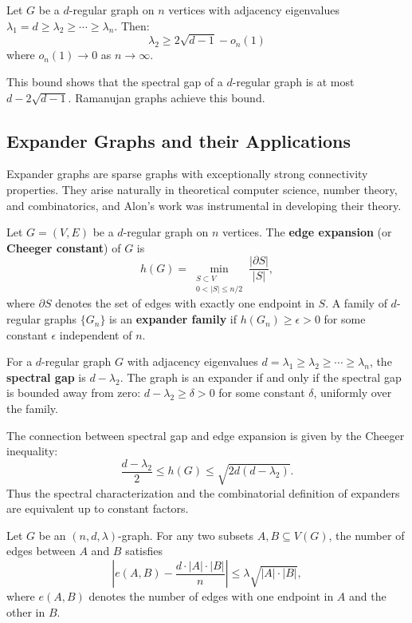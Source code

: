 \begin{theorem}
Let $G$ be a $d$-regular graph on $n$ vertices with adjacency eigenvalues $\lambda_1 = d \geq \lambda_2 \geq \cdots \geq \lambda_n$. Then:
\[
\lambda_2 \geq 2\sqrt{d-1} - o_n(1)
\]
where $o_n(1) \to 0$ as $n \to \infty$.
\end{theorem}

This bound shows that the spectral gap of a $d$-regular graph is at most $d - 2\sqrt{d-1}$. Ramanujan graphs achieve this bound.

\subsection{Expander Graphs and their Applications}

Expander graphs are sparse graphs with exceptionally strong connectivity properties. They arise naturally in theoretical computer science, number theory, and combinatorics, and Alon's work was instrumental in developing their theory.

\begin{definition}
Let $G = (V, E)$ be a $d$-regular graph on $n$ vertices. The \textbf{edge expansion} (or \textbf{Cheeger constant}) of $G$ is
\[
h(G) = \min_{\substack{S \subset V \\ 0 < |S| \leq n/2}} \frac{|\partial S|}{|S|},
\]
where $\partial S$ denotes the set of edges with exactly one endpoint in $S$. A family of $d$-regular graphs $\{G_n\}$ is an \textbf{expander family} if $h(G_n) \geq \epsilon > 0$ for some constant $\epsilon$ independent of $n$.
\end{definition}

\begin{definition}
For a $d$-regular graph $G$ with adjacency eigenvalues $d = \lambda_1 \geq \lambda_2 \geq \cdots \geq \lambda_n$, the \textbf{spectral gap} is $d - \lambda_2$. The graph is an expander if and only if the spectral gap is bounded away from zero: $d - \lambda_2 \geq \delta > 0$ for some constant $\delta$, uniformly over the family.
\end{definition}

The connection between spectral gap and edge expansion is given by the Cheeger inequality:
\[
\frac{d - \lambda_2}{2} \leq h(G) \leq \sqrt{2d(d - \lambda_2)}.
\]
Thus the spectral characterization and the combinatorial definition of expanders are equivalent up to constant factors.

\begin{theorem}
Let $G$ be an $(n, d, \lambda)$-graph. For any two subsets $A, B \subseteq V(G)$, the number of edges between $A$ and $B$ satisfies
\[
\left| e(A, B) - \frac{d \cdot |A| \cdot |B|}{n} \right| \leq \lambda \sqrt{|A| \cdot |B|},
\]
where $e(A,B)$ denotes the number of edges with one endpoint in $A$ and the other in $B$.
\end{theorem}

